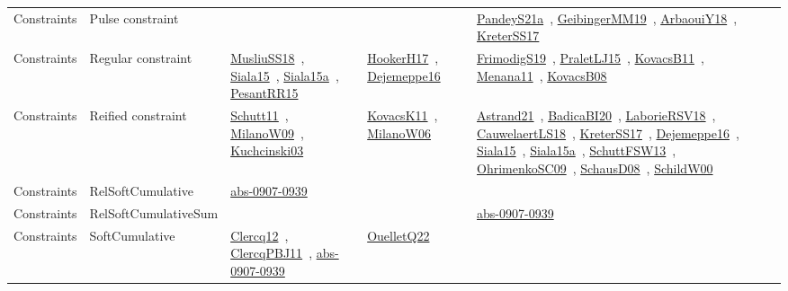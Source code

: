 {\begin{longtable}{lp{3cm}>{\raggedright\arraybackslash}p{6cm}>{\raggedright\arraybackslash}p{6cm}>{\raggedright\arraybackslash}p{8cm}}
Constraints & Pulse constraint &  &  & \href{../works/PandeyS21a.pdf}{PandeyS21a}~\cite{PandeyS21a}, \href{../works/GeibingerMM19.pdf}{GeibingerMM19}~\cite{GeibingerMM19}, \href{../works/ArbaouiY18.pdf}{ArbaouiY18}~\cite{ArbaouiY18}, \href{../works/KreterSS17.pdf}{KreterSS17}~\cite{KreterSS17}\\
Constraints & Regular constraint & \href{../works/MusliuSS18.pdf}{MusliuSS18}~\cite{MusliuSS18}, \href{../works/Siala15.pdf}{Siala15}~\cite{Siala15}, \href{../works/Siala15a.pdf}{Siala15a}~\cite{Siala15a}, \href{../works/PesantRR15.pdf}{PesantRR15}~\cite{PesantRR15} & \href{../works/HookerH17.pdf}{HookerH17}~\cite{HookerH17}, \href{../works/Dejemeppe16.pdf}{Dejemeppe16}~\cite{Dejemeppe16} & \href{../works/FrimodigS19.pdf}{FrimodigS19}~\cite{FrimodigS19}, \href{../works/PraletLJ15.pdf}{PraletLJ15}~\cite{PraletLJ15}, \href{../works/KovacsB11.pdf}{KovacsB11}~\cite{KovacsB11}, \href{../works/Menana11.pdf}{Menana11}~\cite{Menana11}, \href{../works/KovacsB08.pdf}{KovacsB08}~\cite{KovacsB08}\\
Constraints & Reified constraint & \href{../works/Schutt11.pdf}{Schutt11}~\cite{Schutt11}, \href{../works/MilanoW09.pdf}{MilanoW09}~\cite{MilanoW09}, \href{../works/Kuchcinski03.pdf}{Kuchcinski03}~\cite{Kuchcinski03} & \href{../works/KovacsK11.pdf}{KovacsK11}~\cite{KovacsK11}, \href{../works/MilanoW06.pdf}{MilanoW06}~\cite{MilanoW06} & \href{../works/Astrand21.pdf}{Astrand21}~\cite{Astrand21}, \href{../works/BadicaBI20.pdf}{BadicaBI20}~\cite{BadicaBI20}, \href{../works/LaborieRSV18.pdf}{LaborieRSV18}~\cite{LaborieRSV18}, \href{../works/CauwelaertLS18.pdf}{CauwelaertLS18}~\cite{CauwelaertLS18}, \href{../works/KreterSS17.pdf}{KreterSS17}~\cite{KreterSS17}, \href{../works/Dejemeppe16.pdf}{Dejemeppe16}~\cite{Dejemeppe16}, \href{../works/Siala15.pdf}{Siala15}~\cite{Siala15}, \href{../works/Siala15a.pdf}{Siala15a}~\cite{Siala15a}, \href{../works/SchuttFSW13.pdf}{SchuttFSW13}~\cite{SchuttFSW13}, \href{../works/OhrimenkoSC09.pdf}{OhrimenkoSC09}~\cite{OhrimenkoSC09}, \href{../works/SchausD08.pdf}{SchausD08}~\cite{SchausD08}, \href{../works/SchildW00.pdf}{SchildW00}~\cite{SchildW00}\\
Constraints & RelSoftCumulative & \href{../works/abs-0907-0939.pdf}{abs-0907-0939}~\cite{abs-0907-0939} &  & \\
Constraints & RelSoftCumulativeSum &  &  & \href{../works/abs-0907-0939.pdf}{abs-0907-0939}~\cite{abs-0907-0939}\\
Constraints & SoftCumulative & \href{../works/Clercq12.pdf}{Clercq12}~\cite{Clercq12}, \href{../works/ClercqPBJ11.pdf}{ClercqPBJ11}~\cite{ClercqPBJ11}, \href{../works/abs-0907-0939.pdf}{abs-0907-0939}~\cite{abs-0907-0939} & \href{../works/OuelletQ22.pdf}{OuelletQ22}~\cite{OuelletQ22} & \\

\end{longtable}}

